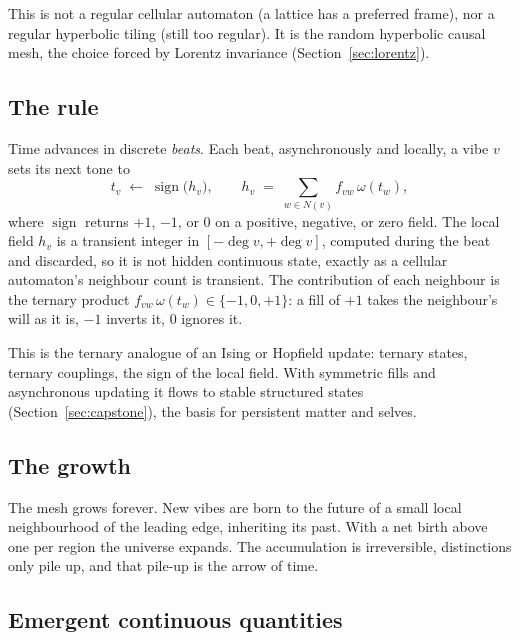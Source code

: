 This is not a regular cellular automaton (a lattice has a preferred frame), nor a
regular hyperbolic tiling (still too regular). It is the random hyperbolic causal mesh,
the choice forced by Lorentz invariance (Section~\ref{sec:lorentz}).

\subsection{The rule}

\begin{definition}
Time advances in discrete \emph{beats}. Each beat, asynchronously and locally, a vibe
$v$ sets its next tone to
\[
t_v \;\leftarrow\; \operatorname{sign}\!\Big( h_v \Big),
\qquad
h_v \;=\; \sum_{w \in N(v)} f_{vw}\,\omega(t_w),
\]
where $\operatorname{sign}$ returns $+1$, $-1$, or $0$ on a positive, negative, or zero
field. The local field $h_v$ is a transient integer in $[-\deg v, +\deg v]$, computed
during the beat and discarded, so it is not hidden continuous state, exactly as a
cellular automaton's neighbour count is transient. The contribution of each neighbour
is the ternary product $f_{vw}\,\omega(t_w) \in \{-1,0,+1\}$: a fill of $+1$ takes the
neighbour's will as it is, $-1$ inverts it, $0$ ignores it.
\end{definition}

This is the ternary analogue of an Ising or Hopfield update: ternary states, ternary
couplings, the sign of the local field. With symmetric fills and asynchronous updating
it flows to stable structured states (Section~\ref{sec:capstone}), the basis for
persistent matter and selves.

\subsection{The growth}

\begin{definition}
The mesh grows forever. New vibes are born to the future of a small local neighbourhood
of the leading edge, inheriting its past. With a net birth above one per region the
universe expands. The accumulation is irreversible, distinctions only pile up, and that
pile-up is the arrow of time.
\end{definition}

\subsection{Emergent continuous quantities}

